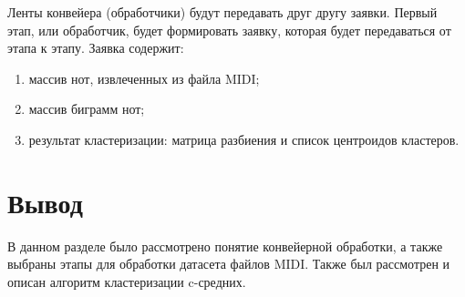 Ленты конвейера (обработчики) будут передавать друг другу заявки.
Первый этап, или обработчик, будет формировать заявку, которая будет передаваться от этапа к этапу.
Заявка содержит:
\begin{enumerate}
	\item массив нот, извлеченных из файла MIDI;
	\item массив биграмм нот;
	\item результат кластеризации: матрица разбиения и список центроидов кластеров.
\end{enumerate}

\section*{Вывод}
В данном разделе было рассмотрено понятие конвейерной обработки, а также выбраны этапы для обработки датасета файлов MIDI.
Также был рассмотрен и описан алгоритм кластеризации c-средних.

